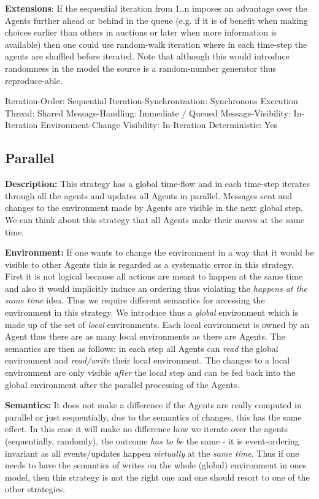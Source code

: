 \textbf{Extensions}: If the sequential iteration from 1..n imposes an advantage over the Agents further ahead or behind in the queue (e.g. if it is of benefit when making choices earlier than others in auctions or later when more information is available) then one could use random-walk iteration where in each time-step the agents are shuffled before iterated. Note that although this would introduce randomness in the model the source is a random-number generator thus reproduce-able.

	Iteration-Order:			Sequential
	Iteration-Synchronization: 	Synchronous
	Execution Thread:			Shared
 	Message-Handling:			Immediate / Queued
 	Message-Visibility:			In-Iteration
 	Environment-Change Visibility:		In-Iteration
	Deterministic:				Yes
	

\subsection{Parallel}
\textbf{Description:} This strategy has a global time-flow and in each time-step iterates through all the agents and updates all Agents in parallel. Messages sent and changes to the environment made by Agents are visible in the next global step. We can think about this strategy that all Agents make their moves at the same time. 

\textbf{Environment:} If one wants to change the environment in a way that it would be visible to other Agents this is regarded as a systematic error in this strategy. First it is not logical because all actions are meant to happen at the same time and also it would implicitly induce an ordering thus violating the \textit{happens at the same time} idea. Thus we require different semantics for accessing the environment in this strategy. We introduce thus a \textit{global} environment which is made up of the set of \textit{local} environments. Each local environment is owned by an Agent thus there are as many local environments as there are Agents. The semantics are then as follows: in each step all Agents can \textit{read} the global environment and \textit{read/write} their local environment. The changes to a local environment are only visible \textit{after} the local step and can be fed back into the global environment after the parallel processing of the Agents.

\textbf{Semantics:} It does not make a difference if the Agents are really computed in parallel or just sequentially, due to the semantics of changes, this has the same effect. In this case it will make no difference how we iterate over the agents (sequentially, randomly), the outcome \textit{has to be} the same - it is event-ordering invariant as all events/updates happen \textit{virtually} at the \textit{same time}. Thus if one needs to have the semantics of writes on the whole (global) environment in ones model, then this strategy is not the right one and one should resort to one of the other strategies.

